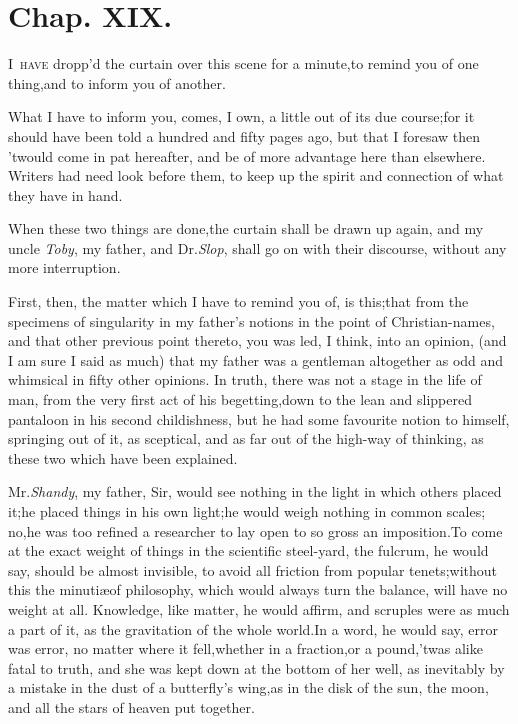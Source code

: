 \documentclass{article}
\begin{document}
\bigskip

\section{Chap. XIX.}

\lettrine{I}{\, have} dropp’d the curtain over this\break
scene for a minute,\tsk to remind you of one
thing,\tsk and to inform you of an\-other.

What I have to inform you, comes, I own, a little out of its due
course;\tsh for it should have been told a hundred and\pb
fifty pages ago, but that I foresaw then ’twould come in pat hereafter, and be of
more advantage here than elsewhere.\tsh\break
Writers had need look before them, to keep up the spirit and
connection of what they have in hand.

When these two things are done,\tsk the curtain shall be drawn
up again, and my uncle \textit{Toby}, my father, and Dr.\@ \textit{Slop},
shall go on with their discourse, without any more
interruption.

First, then, the matter which I have to remind you of, is
this;\tsh that from the specimens of singularity in my
father’s notions in the point of Christian-names, and that
other previous point thereto,\tsk\break
you was led, I think, into an opinion,
(and I am sure I said as much) that my father was a
gentleman altogether as odd\pb
and whimsical in fifty other opinions.
In truth, there was not a stage in the life of man, from the very
first act of his begetting,\tsh down to the lean and
slippered pantaloon in his second childishness, but he had some
favourite notion to himself, springing out of it, as sceptical, and
as far out of the high-way of thinking, as these two which have been
explained.

\tsk Mr.\@ \textit{Shandy}, my father, Sir, would see nothing in
the light in which others placed it;\tsk he placed things in his
own light;\tsk he would weigh nothing in common scales;\tsk
no,\tsk he was too refined a researcher to lay open to so gross an
imposition.\tsk To come at the exact weight of things in the
scientific steel-yard, the fulcrum, he would say, should be almost
invisible, to avoid all friction from popular tenets;\tsk without
this the minutiæ\pb of philosophy, which would always turn the
balance, will have no weight at all.\tsk\break
Knowledge, like matter, he would affirm,
and scruples were as much a part of it, as the gravitation of the whole world.\tsk In
a word, he would say, error was error,\tsk\break
no matter where it fell,\tsh whether in a fraction,\tsh or a pound,\tsk ’twas alike
fatal to truth, and she was kept down at the bottom of her well,
as inevitably by a mistake in the dust of a butterfly’s
wing,\break\tsk as in the disk of the sun, the moon, and all the stars
of heaven put together.
\end{document}

